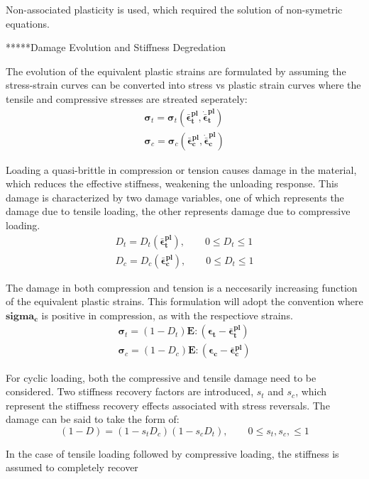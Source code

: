 Non-associated plasticity  is used, which required the solution of non-symetric equations.


*****Damage Evolution and Stiffness Degredation

The evolution of the equivalent plastic strains are formulated by assuming the stress-strain curves can be converted  into stress vs plastic strain curves where the tensile and compressive stresses are streated seperately:
\begin{equation}
\label{eqn:dam1}
\begin{aligned}
\boldsymbol{\sigma}_t = \boldsymbol{\sigma}_t(\boldsymbol{\bar{\epsilon}^{pl}_t},
	\boldsymbol{\dot{\bar{\epsilon}}^{pl}_t}) \\
\boldsymbol{\sigma}_c = \boldsymbol{\sigma}_c(\boldsymbol{\bar{\epsilon}^{pl}_c},
	\boldsymbol{\dot{\bar{\epsilon}}^{pl}_c})
\end{aligned}
\end{equation}

Loading a quasi-brittle in compression or tension causes damage in the material, which reduces the effective stiffness, weakening the unloading response. This damage is characterized by two damage variables, one of which represents the damage due to tensile loading, the other represents damage due to compressive loading. 
\begin{equation}
\label{eqn:dam2}
\begin{aligned}
D_t = D_t(\boldsymbol{\bar{\epsilon}^{pl}_t}),\qquad 0 \leq D_t \leq 1 \\
D_c = D_c(\boldsymbol{\bar{\epsilon}^{pl}_c}),\qquad 0 \leq D_t \leq 1
\end{aligned}
\end{equation}

The damage in both compression and tension is a neccesarily increasing function of the equivalent plastic strains. This formulation will adopt the convention where $\boldsymbol{sigma_c}$ is positive in compression, as with the respectiove strains.
\begin{equation}
\label{eqn:dam3}
\begin{aligned}
\boldsymbol{\sigma}_t = (1-D_t)\mathbf{E}:(\boldsymbol{\epsilon_t} - \boldsymbol{\bar{\epsilon}^{pl}_t}) \\
\boldsymbol{\sigma}_c = (1-D_c)\mathbf{E}:(\boldsymbol{\epsilon_c} - \boldsymbol{\bar{\epsilon}^{pl}_c})
\end{aligned}
\end{equation}

For cyclic loading, both the compressive and tensile damage need to be considered. Two stiffness recovery factors are introduced, $s_t$ and $s_c$, which represent the stiffness recovery effects associated with stress reversals. The damage can be said to take the form of:
\begin{equation}
\label{eqn:dam4}
(1-D) = (1-s_t D_c)(1-s_c D_t),\qquad 0 \leq s_t, s_c, \leq 1
\end{equation}

In the case of tensile loading followed by compressive loading, the stiffness is assumed to completely recover

